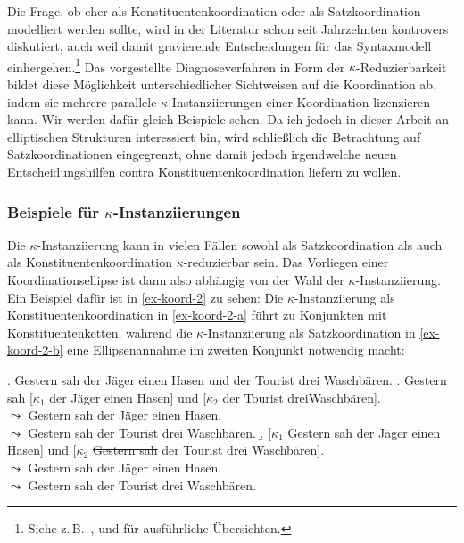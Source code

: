 Die Frage, ob  eher als Konstituentenkoordination oder als Satzkoordination modelliert werden sollte, wird in der Literatur schon seit Jahrzehnten kontrovers diskutiert, auch weil damit gravierende Entscheidungen für das Syntaxmodell einhergehen.\footnote{Siehe z.\,B.\  \citet[Chapter~1]{Oirsouw:87}, \citet[61ff]{Wilder:97} und \citet[32ff]{Hartmann:00} für ausführliche Übersichten.} Das vorgestellte Diagnoseverfahren in Form der $\kappa$-Reduzierbarkeit bildet diese Möglichkeit unterschiedlicher Sichtweisen auf die Koordination ab, indem sie mehrere parallele $\kappa$-Instanziierungen einer Koordination lizenzieren kann. Wir werden dafür gleich Beispiele sehen. Da ich jedoch in dieser Arbeit an elliptischen Strukturen interessiert bin, wird schlie\ss lich die Betrachtung auf Satzkoordinationen eingegrenzt, ohne damit jedoch irgendwelche neuen Entscheidungshilfen contra Konstituentenkoordination liefern zu wollen. 

\subsubsection*{Beispiele für $\kappa$-Instanziierungen}

Die $\kappa$-Instanziierung kann in vielen Fällen sowohl als Satzkoordination als auch als Konstituentenkoordination $\kappa$-reduzierbar sein. Das Vorliegen einer Koordinationsellipse ist dann also abhängig von der Wahl der $\kappa$-Instanziierung. Ein Beispiel dafür ist in \ref{ex-koord-2} zu sehen: Die $\kappa$-Instanziierung als Konstituentenkoordination in \ref{ex-koord-2-a} führt zu Konjunkten mit Konstituentenketten, während die $\kappa$-Instanziierung als Satzkoordination in \ref{ex-koord-2-b} eine Ellipsenannahme im zweiten Konjunkt notwendig macht: 

\ex. Gestern sah der Jäger einen Hasen und der Tourist drei Waschbären. \label{ex-koord-2}
\a. \label{ex-koord-2-a} Gestern sah [$\kappa_1$ der Jäger einen Hasen] und [$\kappa_2$ der Tourist drei\linebreak Waschbären]. \\
$\leadsto$ Gestern sah der Jäger einen Hasen. \\
$\leadsto$ Gestern sah der Tourist drei Waschbären. 
\b. \label{ex-koord-2-b} [$\kappa_1$ Gestern sah der Jäger einen Hasen] und [$\kappa_2$ \sout{Gestern sah} der Tourist drei Waschbären]. \\
$\leadsto$ Gestern sah der Jäger einen Hasen. \\
$\leadsto$ Gestern sah der Tourist drei Waschbären. 

